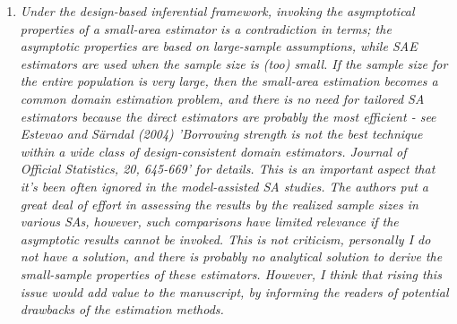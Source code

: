 \documentclass{article}
\begin{document}
\begin{enumerate}
  	
  	\item \textit{Under the design-based inferential framework, invoking the asymptotical properties of a small-area estimator is a contradiction in terms; the asymptotic properties are based on large-sample assumptions, while SAE estimators are used when the sample size is (too) small. If the sample size for the entire population is very large, then the small-area estimation becomes a common domain estimation problem, and there is no need for tailored SA estimators because the direct estimators are probably the most efficient -  see Estevao and Särndal (2004) 'Borrowing strength is not the best technique within a wide class of design-consistent domain estimators.  Journal of Official Statistics, 20, 645-669' for details. This is an important aspect that it’s been often ignored in the model-assisted SA studies. The authors put a great deal of effort in assessing the results by the realized sample sizes in various SAs, however, such comparisons have limited relevance if the asymptotic results cannot be invoked. This is not criticism, personally I do not have a solution, and there is probably no analytical solution to derive the small-sample properties of these estimators. However, I think that rising this issue would add value to the manuscript, by informing the readers of potential drawbacks of the estimation methods.}
  	

\end{enumerate}
\end{document}

